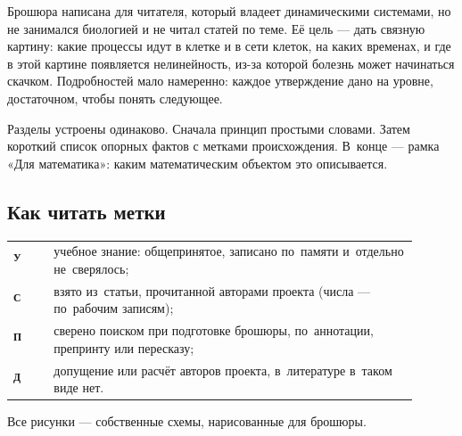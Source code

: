 \documentclass[11pt,a4paper,landscape,twocolumn]{article}
\newcommand{\tU}{\textsuperscript{\sffamily\bfseries\color{cM}У}}
\newcommand{\tS}{\textsuperscript{\sffamily\bfseries\color{cB}С}}
\newcommand{\tP}{\textsuperscript{\sffamily\bfseries\color{cA}П}}
\newcommand{\tD}{\textsuperscript{\sffamily\bfseries\color{cO}Д}}
\begin{document}

Брошюра написана для читателя, который владеет динамическими системами, но не занимался биологией и не читал статей по теме. Её цель — дать связную картину: какие процессы идут в клетке и в сети клеток, на каких временах, и где в этой картине появляется нелинейность, из-за которой болезнь может начинаться скачком. Подробностей мало намеренно: каждое утверждение дано на уровне, достаточном, чтобы понять следующее.

Разделы устроены одинаково. Сначала принцип простыми словами. Затем короткий список опорных фактов с метками происхождения. В~конце — рамка «Для математика»: каким математическим объектом это описывается.

\subsection{Как читать метки}
\begin{tabular}{@{}l@{\ \ }p{0.9\linewidth}@{}}
\tU & учебное знание: общепринятое, записано по~памяти и~отдельно не~сверялось;\\
\tS & взято из~статьи, прочитанной авторами проекта (числа — по~рабочим записям);\\
\tP & сверено поиском при подготовке брошюры, по~аннотации, препринту или пересказу;\\
\tD & допущение или расчёт авторов проекта, в~литературе в~таком виде нет.\\
\end{tabular}

Все рисунки — собственные схемы, нарисованные для брошюры.
\end{document}
